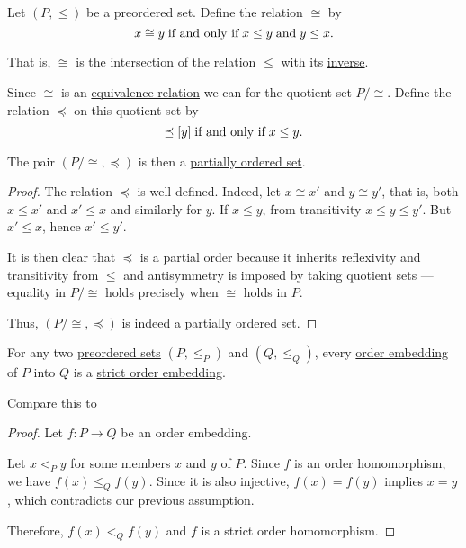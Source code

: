 \begin{proposition}\label{thm:preorder_to_partial_order}
  Let \( (P, \leq) \) be a preordered set. Define the relation \( \cong \) by
  \begin{equation}\label{eq:thm:preorder_to_partial_order/equivalence}
    x \cong y \T{if and only if} x \leq y \T{and} y \leq x.
  \end{equation}

  That is, \( \cong \) is the intersection of the relation \( \leq \) with its \hyperref[def:binary_relation/converse]{inverse}.

  Since \( \cong \) is an \hyperref[def:equivalence_relation]{equivalence relation} we can for the quotient set \( P / \cong \). Define the relation \( \preceq \) on this quotient set by
  \begin{equation*}
    [x] \preceq [y] \T{if and only if} x \leq y.
  \end{equation*}

  The pair \( (P / \cong, \preceq) \) is then a \hyperref[def:partially_ordered_set]{partially ordered set}.
\end{proposition}
\begin{proof}
  The relation \( \preceq \) is well-defined. Indeed, let \( x \cong x' \) and \( y \cong y' \), that is, both \( x \leq x' \) and \( x' \leq x \) and similarly for \( y \). If \( x \leq y \), from transitivity \( x \leq y \leq y' \). But \( x' \leq x \), hence \( x' \leq y' \).

  It is then clear that \( \preceq \) is a partial order because it inherits reflexivity and transitivity from \( \leq \) and antisymmetry is imposed by taking quotient sets --- equality in \( P / \cong \) holds precisely when \( \cong \) holds in \( P \).

  Thus, \( (P / \cong, \preceq) \) is indeed a partially ordered set.
\end{proof}

\begin{proposition}\label{thm:order_embedding_is_strict}
  For any two \hyperref[def:preordered_set]{preordered sets} \( (P, \leq_P) \) and \( (Q, \leq_Q) \), every \hyperref[def:partially_ordered_set/homomorphism]{order embedding} of \( P \) into \( Q \) is a \hyperref[def:partially_ordered_set/homomorphism]{strict order embedding}.

  Compare this to 
\end{proposition}
\begin{proof}
  Let \( f: P \to Q \) be an order embedding.

  Let \( x <_P y \) for some members \( x \) and \( y \) of \( P \). Since \( f \) is an order homomorphism, we have \( f(x) \leq_Q f(y) \). Since it is also injective, \( f(x) = f(y) \) implies \( x = y \), which contradicts our previous assumption.

  Therefore, \( f(x) <_Q f(y) \) and \( f \) is a strict order homomorphism.
\end{proof}

